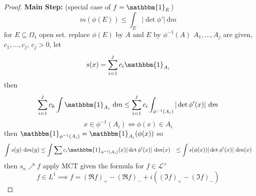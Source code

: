 \begin{proof}
  \textbf{Main Step:} (special case of $f = \mathbbm{1}_E$)
  \[m(\phi(E)) \le \int_E |\det \phi'| \ \mathrm{d}m\]
  for $E \subseteq \Omega_1$ open set.
  replace $\phi(E)$ by $A$ and $E$ by $\phi^{-1}(A)$
  $A_1, \dotsc, A_j$ are given, $c_1, \dotsc, c_j$, $c_j > 0$,
  let 
  \[s(x) = \sum_{i=1}^j c_i \mathbbm{1}_{A_i}\]
  then
  \begin{align*}
    \sum_{i=1}^j c_k \int \mathbbm{1}_{A_i} \ \mathrm{d}m \le \sum_{i=1}^j c_i \int_{\phi^{-1}(A_i)} |\det \phi'(x)| \ \mathrm{d}m
  \end{align*}
  \[x \in \phi^{-1}(A_i) \iff \phi(x) \in A_i\]
  then $\mathbbm{1}_{\phi^{-1}(A_i)} = \mathbbm{1}_{A_i} (\phi(x))$
  so
  \begin{align*}
    \int s(y) \ \mathrm{d}m(y) &\le \int \sum c_i \mathbbm{1}_{\phi^{-1}(A_i)}(x) |\det \phi'(x)| \ \mathrm{d}m(x)
    &\le \int s(\phi(x)) |\det \phi'(x)| \ \mathrm{d}m(x)
  \end{align*}
  then $s_n \nearrow f$ apply MCT given the formula for $f \in \mathcal{L}^+$
  \[f \in L^1 \implies f = (\Re f)_+ - (\Re f)_- + i((\Im f)_+ - (\Im f)_-)\]
\end{proof}

